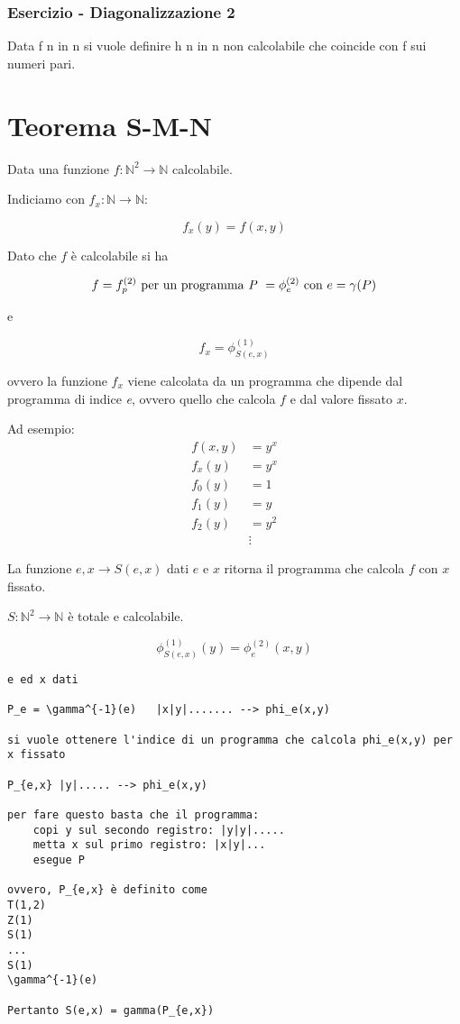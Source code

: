 \subsubsection{Esercizio - Diagonalizzazione 2}

Data f n in n si vuole definire h n in n non calcolabile che coincide con f sui numeri pari.

\section{Teorema S-M-N}

Data una funzione $ f : \mathbb{N}^2 \rightarrow \mathbb{N} $ calcolabile.

Indiciamo con $ f_x : \mathbb{N} \rightarrow \mathbb{N}$:

$$
f_x (y) = f(x,y)
$$

Dato che $ f $ è calcolabile si ha

$$
f = f_{p}^{(2)} \text{ per un programma \textit{P} } = \phi_{e}^{(2)} \text{ con } e = \gamma(P)
$$

e 

$$
f_x = \phi_{S(e,x)}^{(1)}
$$

ovvero la funzione $ f_x $ viene calcolata da un programma che dipende dal programma di indice \textit{e}, ovvero quello che calcola $ f $ e dal valore fissato $ x $.

Ad esempio:
\begin{align*}
f(x,y) &= y^x \\
f_x(y) &= y^x \\
f_0(y) &= 1 \\
f_1(y) &= y \\
f_2(y) &= y^2 \\
&\vdots 
\end{align*}

La funzione $ e,x \rightarrow S(e,x) $ dati $ e $ e $ x $ ritorna il programma che calcola $ f $ con $ x $ fissato.

$ S : \mathbb{N}^2 \rightarrow \mathbb{N} $ è totale e calcolabile.

$$
\phi_{S(e,x)}^{(1)}(y) = \phi_{e}^{(2)}(x,y)
$$

\begin{verbatim}
e ed x dati

P_e = \gamma^{-1}(e)   |x|y|....... --> phi_e(x,y)

si vuole ottenere l'indice di un programma che calcola phi_e(x,y) per x fissato

P_{e,x} |y|..... --> phi_e(x,y)

per fare questo basta che il programma:
	copi y sul secondo registro: |y|y|.....
	metta x sul primo registro: |x|y|...
	esegue P

ovvero, P_{e,x} è definito come
T(1,2)
Z(1)
S(1)
...
S(1)
\gamma^{-1}(e)

Pertanto S(e,x) = gamma(P_{e,x})
\end{verbatim}

